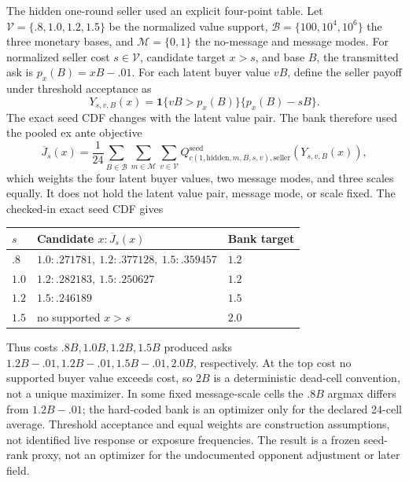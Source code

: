 The hidden one-round seller used an explicit four-point table. Let
$\mathcal V=\{.8,1.0,1.2,1.5\}$ be the normalized value support,
$\mathcal B=\{100,10^4,10^6\}$ the three monetary bases, and
$\mathcal M=\{0,1\}$ the no-message and message modes. For normalized seller
cost $s\in\mathcal V$, candidate target $x>s$, and base $B$, the transmitted
ask is $p_x(B)=xB-.01$. For each latent buyer value $vB$, define the seller
payoff under threshold acceptance as
\begin{equation}
Y_{s,v,B}(x)=\mathbf 1\{vB>p_x(B)\}\{p_x(B)-sB\}.
\end{equation}
The exact seed CDF changes with the latent value pair. The bank therefore used
the pooled ex ante objective
\begin{equation}
\overline J_s(x)=\frac{1}{24}
\sum_{B\in\mathcal B}\sum_{m\in\mathcal M}\sum_{v\in\mathcal V}
Q^{\mathrm{seed}}_{c(1,\mathrm{hidden},m,B,s,v),\mathrm{seller}}
\!\left(Y_{s,v,B}(x)\right),
\label{eq:hidden_seller_seed_objective}
\end{equation}
which weights the four latent buyer values, two message modes, and three scales
equally. It does not hold the latent value pair, message mode, or scale fixed.
The checked-in exact seed CDF gives
\begin{center}
\small
\begin{tabular}{@{}lll@{}}
\toprule
$s$ & Candidate $x:\overline J_s(x)$ & Bank target \\
\midrule
$.8$ & $1.0:.271781,\ 1.2:.377128,\ 1.5:.359457$ & $1.2$ \\
$1.0$ & $1.2:.282183,\ 1.5:.250627$ & $1.2$ \\
$1.2$ & $1.5:.246189$ & $1.5$ \\
$1.5$ & no supported $x>s$ & $2.0$ \\
\bottomrule
\end{tabular}
\end{center}
Thus costs $.8B,1.0B,1.2B,1.5B$ produced asks
$1.2B-.01,1.2B-.01,1.5B-.01,2.0B$, respectively. At the top cost no supported
buyer value exceeds cost, so $2B$ is a deterministic dead-cell convention, not
a unique maximizer. In some fixed message-scale cells the $.8B$ argmax differs
from $1.2B-.01$; the hard-coded bank is an optimizer only for the declared
24-cell average. Threshold acceptance and equal weights are construction
assumptions, not identified live response or exposure frequencies. The result
is a frozen seed-rank proxy, not an optimizer for the undocumented opponent
adjustment or later field.

